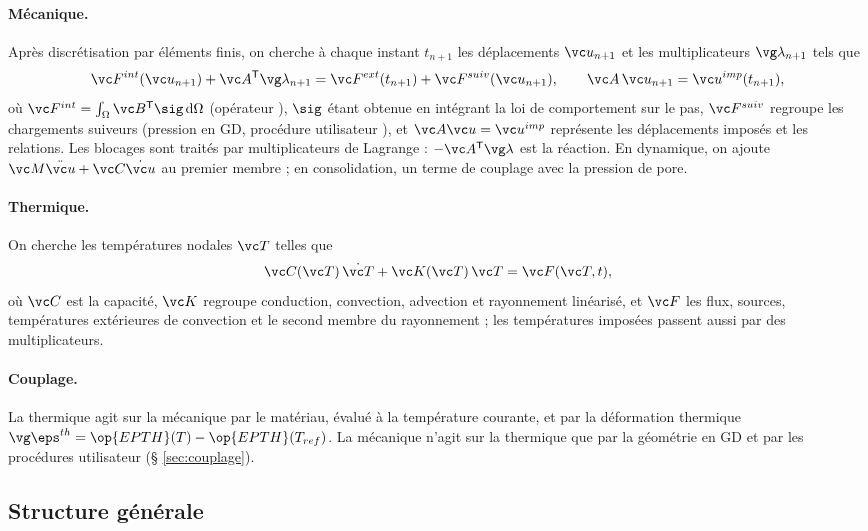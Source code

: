 \paragraph{Mécanique.}
Après discrétisation par éléments finis, on cherche à chaque instant $t_{n+1}$ les déplacements $\vc u_{n+1}$ et les multiplicateurs $\vg\lambda_{n+1}$ tels que
\begin{equation}
\label{eq:equilibre}
\vc F^{int}(\vc u_{n+1}) + \vc A^{\mathsf T}\vg\lambda_{n+1} = \vc F^{ext}(t_{n+1}) + \vc F^{suiv}(\vc u_{n+1}),
\qquad
\vc A\,\vc u_{n+1} = \vc u^{imp}(t_{n+1}),
\end{equation}
où $\vc F^{int} = \int_\Omega \vc B^{\mathsf T}\sig\,\mathrm d\Omega$ (opérateur ), $\sig$ étant obtenue en intégrant la loi de comportement sur le pas, $\vc F^{suiv}$ regroupe les chargements suiveurs (pression en GD, procédure utilisateur ), et $\vc A\vc u = \vc u^{imp}$ représente les déplacements imposés et les relations.
Les blocages sont traités par multiplicateurs de Lagrange : $-\vc A^{\mathsf T}\vg\lambda$ est la réaction.
En dynamique, on ajoute $\vc M\ddot{\vc u} + \vc C\dot{\vc u}$ au premier membre ; en consolidation, un terme de couplage avec la pression de pore.

\paragraph{Thermique.}
On cherche les températures nodales $\vc T$ telles que
\begin{equation}
\label{eq:thermique}
\vc C(\vc T)\,\dot{\vc T} + \vc K(\vc T)\,\vc T = \vc F(\vc T, t),
\end{equation}
où $\vc C$ est la capacité, $\vc K$ regroupe conduction, convection, advection et rayonnement linéarisé, et $\vc F$ les flux, sources, températures extérieures de convection et le second membre du rayonnement ; les températures imposées passent aussi par des multiplicateurs.

\paragraph{Couplage.}
La thermique agit sur la mécanique par le matériau, évalué à la température courante, et par la déformation thermique $\vg\eps^{th} = \op{EPTH}(T) - \op{EPTH}(T_{ref})$.
La mécanique n'agit sur la thermique que par la géométrie en GD et par les procédures utilisateur (§ \ref{sec:couplage}).

\subsection{Structure générale}

